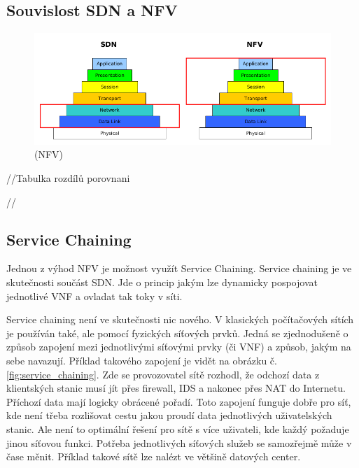 \subsection{Souvislost SDN a NFV}

\begin{figure}[h]
\begin{centering}
\includegraphics[scale=0.5]{images/sdn_nfv}
\par\end{centering}
\caption{ (NFV)\label{fig:vize_NFV}}
\end{figure}

//Tabulka rozdílů porovnani

//

\subsection{Service Chaining} \label{sub:SDN}

Jednou z výhod NFV je možnost využít Service Chaining. Service chaining je ve skutečnosti součást SDN. Jde o princip jakým lze dynamicky pospojovat jednotlivé VNF a ovladat tak toky v síti. \cite{SDN_book}

Service chaining není ve skutečnosti nic nového. V klasických počítačových sítích je používán také, ale pomocí fyzických síťových prvků. Jedná se zjednodušeně o způsob zapojení mezi jednotlivými síťovými prvky (či VNF) a způsob, jakým na sebe navazují. Příklad takového zapojení je vidět na obrázku č. \ref{fig:service_chaining}. Zde se provozovatel sítě rozhodl, že odchozí data z klientských stanic musí jít přes firewall, IDS a nakonec přes NAT do Internetu. Příchozí data mají logicky obrácené pořadí. Toto zapojení funguje dobře pro síť, kde není třeba rozlišovat cestu jakou proudí data jednotlivých uživatelských stanic. Ale není to optimální řešení pro sítě s více uživateli, kde každý požaduje jinou síťovou funkci. Potřeba jednotlivých síťových služeb se samozřejmě může v čase měnit. Příklad takové sítě lze nalézt ve většině datových center. 

